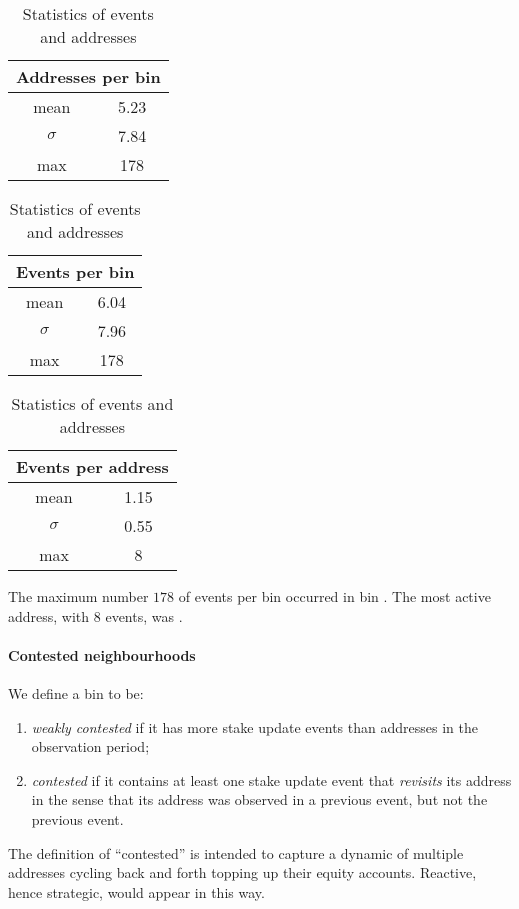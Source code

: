 \begin{table} 
  \hfill
  \begin{tabular}{cc}
    \multicolumn{2}{l}{Addresses per bin} \\
    \toprule 
    mean      & 5.23 \\
    $\sigma$  & 7.84 \\
    max       & 178 \\
    \bottomrule
  \end{tabular}
  \hfill
  \begin{tabular}{cc}
    \multicolumn{2}{l}{Events per bin} \\
    \toprule 
    mean      & 6.04 \\
    $\sigma$  & 7.96 \\
    max       & 178 \\
    \bottomrule
  \end{tabular}
  \hfill
  \begin{tabular}{cc}
    \multicolumn{2}{l}{Events per address}\\
    \toprule
    mean      & 1.15 \\
    $\sigma$  & 0.55 \\
    max       & 8  \\
    \bottomrule
  \end{tabular}
  \hfill
  \caption{
    Statistics of events and addresses
  }
  \label{event-statistics}
\end{table}

The maximum number $178$ of events per bin occurred in bin .
%
The most active address, with $8$ events, was .

\paragraph{Contested neighbourhoods}
We define a bin to be:
\begin{enumerate}
  \item \emph{weakly contested} if it has more stake update events than addresses in the observation period;
  \item \emph{contested} if it contains at least one stake update event that \emph{revisits} its address in the sense that its address was observed in a previous event, but not the previous event.
\end{enumerate}
The definition of ``contested'' is intended to capture a dynamic of multiple addresses cycling back and forth topping up their equity accounts.
%
Reactive, hence strategic, would appear in this way.

